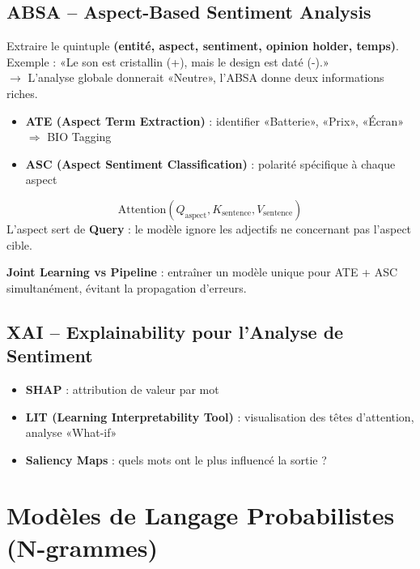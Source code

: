 \documentclass[a4paper,10pt]{article}
\begin{document}
\subsection{ABSA -- Aspect-Based Sentiment Analysis}

\begin{definitionbox}
Extraire le quintuple \textbf{(entité, aspect, sentiment, opinion holder, temps)}.\\
Exemple : «Le son est cristallin (+), mais le design est daté (-).» \\
$\rightarrow$ L'analyse globale donnerait «Neutre», l'ABSA donne deux informations riches.
\end{definitionbox}

\begin{itemize}
  \item \textbf{ATE (Aspect Term Extraction)} : identifier «Batterie», «Prix», «Écran» $\Rightarrow$ BIO Tagging
  \item \textbf{ASC (Aspect Sentiment Classification)} : polarité spécifique à chaque aspect
\end{itemize}

\begin{formulebox}
\[
\text{Attention}(Q_{\text{aspect}}, K_{\text{sentence}}, V_{\text{sentence}})
\]
L'aspect sert de \textbf{Query} : le modèle ignore les adjectifs ne concernant pas l'aspect cible.
\end{formulebox}

\textbf{Joint Learning vs Pipeline} : entraîner un modèle unique pour ATE + ASC simultanément, évitant la propagation d'erreurs.

\subsection{XAI -- Explainability pour l'Analyse de Sentiment}
\begin{itemize}
  \item \textbf{SHAP} : attribution de valeur par mot
  \item \textbf{LIT (Learning Interpretability Tool)} : visualisation des têtes d'attention, analyse «What-if»
  \item \textbf{Saliency Maps} : quels mots ont le plus influencé la sortie ?
\end{itemize}

\section{Modèles de Langage Probabilistes (N-grammes)}
\end{document}
